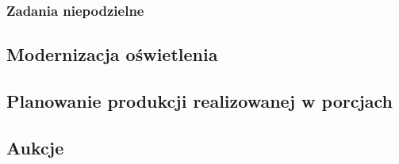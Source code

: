 \documentclass[
    12pt, %
]{../fphw}
\begin{document}
\subsubsection{Zadania niepodzielne}

\subsection{Modernizacja oświetlenia}
\subsection{Planowanie produkcji realizowanej w porcjach}
\subsection{Aukcje}
\end{document}
